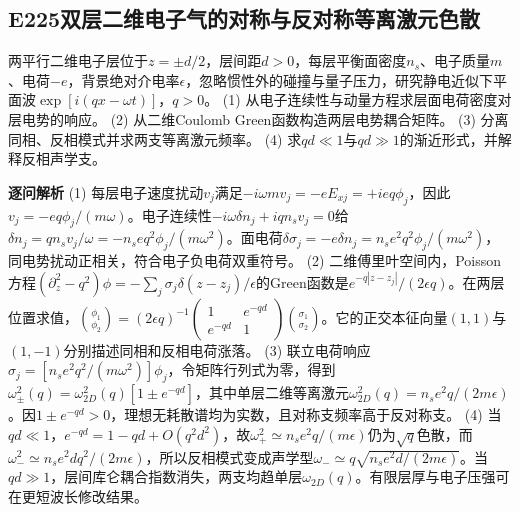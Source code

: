 \subsection*{E225\quad 双层二维电子气的对称与反对称等离激元色散}
两平行二维电子层位于$z=\pm d/2$，层间距$d>0$，每层平衡面密度$n_s$、电子质量$m$、电荷$-e$，背景绝对介电率$\epsilon$，忽略惯性外的碰撞与量子压力，研究静电近似下平面波$\exp[i(qx-\omega t)]$，$q>0$。
(1) 从电子连续性与动量方程求层面电荷密度对层电势的响应。
(2) 从二维Coulomb Green函数构造两层电势耦合矩阵。
(3) 分离同相、反相模式并求两支等离激元频率。
(4) 求$qd\ll1$与$qd\gg1$的渐近形式，并解释反相声学支。
\par\textbf{逐问解析}
(1) 每层电子速度扰动$v_j$满足$-i\omega mv_j=-eE_{xj}=+ieq\phi_j$，因此$v_j=-eq\phi_j/(m\omega)$。电子连续性$-i\omega\delta n_j+iqn_sv_j=0$给$\delta n_j=qn_sv_j/\omega=-n_se q^2\phi_j/(m\omega^2)$。面电荷$\delta\sigma_j=-e\delta n_j=n_se^2q^2\phi_j/(m\omega^2)$，同电势扰动正相关，符合电子负电荷双重符号。
(2) 二维傅里叶空间内，Poisson方程$(\partial_z^2-q^2)\phi=-\sum_j\sigma_j\delta(z-z_j)/\epsilon$的Green函数是$e^{-q|z-z_j|}/(2\epsilon q)$。在两层位置求值，$\binom{\phi_1}{\phi_2}=(2\epsilon q)^{-1}\begin{pmatrix}1&e^{-qd}\\e^{-qd}&1\end{pmatrix}\binom{\sigma_1}{\sigma_2}$。它的正交本征向量$(1,1)$与$(1,-1)$分别描述同相和反相电荷涨落。
(3) 联立电荷响应$\sigma_j=[n_se^2q^2/(m\omega^2)]\phi_j$，令矩阵行列式为零，得到$\omega_\pm^2(q)=\omega_{2D}^2(q)[1\pm e^{-qd}]$，其中单层二维等离激元$\omega_{2D}^2(q)=n_se^2q/(2m\epsilon)$。因$1\pm e^{-qd}>0$，理想无耗散谱均为实数，且对称支频率高于反对称支。
(4) 当$qd\ll1$，$e^{-qd}=1-qd+O(q^2d^2)$，故$\omega_+^2\simeq n_se^2q/(m\epsilon)$仍为$\sqrt q$色散，而$\omega_-^2\simeq n_se^2dq^2/(2m\epsilon)$，所以反相模式变成声学型$\omega_-\simeq q\sqrt{n_se^2d/(2m\epsilon)}$。当$qd\gg1$，层间库仑耦合指数消失，两支均趋单层$\omega_{2D}(q)$。有限层厚与电子压强可在更短波长修改结果。
\par\medskip
